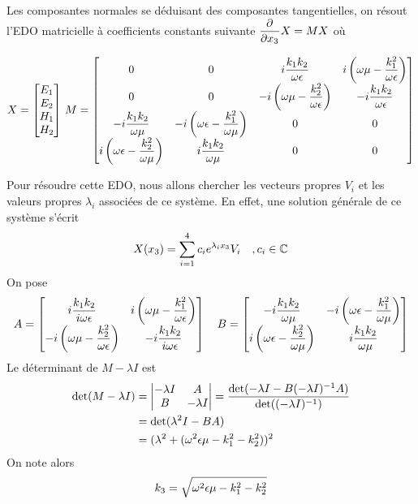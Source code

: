Les composantes normales se déduisant des composantes tangentielles, on résout l'EDO matricielle à coefficients constants 
suivante $\dfrac{\partial^{{}} }{{\partial x_3}^{{}}}X = M X$ où

\begin{equation}
    X = 
    \begin{bmatrix}
    E_1 \\ 
    E_2 \\ 
    H_1 \\ 
    H_2 \\
    \end{bmatrix}\,
    M = \begin{bmatrix}
    0 & 0 & i\dfrac{k_1k_2}{\omega\epsilon} & i\left(\omega\mu - \dfrac{k_1^2}{\omega\epsilon}\right)\\
    0 & 0 & -i\left(\omega\mu - \dfrac{k_2^2}{\omega\epsilon}\right) & -i\dfrac{k_1k_2}{\omega\epsilon}\\
    -i\dfrac{k_1k_2}{\omega\mu} & -i\left(\omega\epsilon - \dfrac{k_1^2}{\omega\mu}\right) & 0 & 0 \\
    i\left(\omega\epsilon - \dfrac{k_2^2}{\omega\mu}\right) & i\dfrac{k_1k_2}{\omega\mu} & 0 & 0 \\
    \end{bmatrix}
\end{equation}

Pour résoudre cette EDO, nous allons chercher les vecteurs propres $V_i$ et les valeurs propres $\lambda_i$ associées de ce système. En effet, une solution générale de ce système s'écrit
\begin{equation}
    X(x_3)= \sum\limits_{i=1}^{4}c_i e^{\lambda_i x_3} V_i \quad , c_i \in \mathbb C
\end{equation}
On pose 
\begin{equation}
    A = \begin{bmatrix}
        i\dfrac{k_1k_2}{i\omega\epsilon} & i\left(\omega\mu - \dfrac{k_1^2}{\omega\epsilon}\right) \\
        -i\left(\omega\mu - \dfrac{k_2^2}{\omega\epsilon}\right) & -i\dfrac{k_1k_2}{i\omega\epsilon} \\
    \end{bmatrix}
    \quad
    B = \begin{bmatrix}
        -i\dfrac{k_1k_2}{\omega\mu} & -i\left(\omega\epsilon - \dfrac{k_1^2}{\omega\mu}\right) \\
        i\left(\omega\epsilon - \dfrac{k_2^2}{\omega\mu}\right) & i\dfrac{k_1k_2}{\omega\mu} \\
    \end{bmatrix}
\end{equation}
Le déterminant de $M-\lambda I$ est
\begin{align*}
    \det(M-\lambda I) &= 
    \begin{vmatrix}
        -\lambda I & A \\
        B & -\lambda I
    \end{vmatrix}
        = \dfrac{\det(- \lambda I - B(-\lambda I)^{-1} A)}{\det((-\lambda I)^{-1})} \\
        &= \det(\lambda^2 I - BA) \\
        &= (\lambda^2 + (\omega^2\epsilon\mu - k_1^2 -k_2^2))^2
\end{align*}
On note alors 
\begin{equation}
k_3=\sqrt{\omega^2\epsilon\mu - k_1^2 -k_2^2}
\end{equation}


